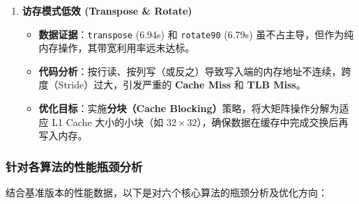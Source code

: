 \documentclass[a4paper]{article}
\begin{document}
\begin{enumerate}
    \item \textbf{访存模式低效 (Transpose \& Rotate)}
    \begin{itemize}
        \item \textbf{数据证据}：\texttt{transpose} (6.94s) 和 \texttt{rotate90} (6.79s) 虽不占主导，但作为纯内存操作，其带宽利用率远未达标。
        \item \textbf{代码分析}：按行读、按列写（或反之）导致写入端的内存地址不连续，跨度（Stride）过大，引发严重的 \textbf{Cache Miss} 和 \textbf{TLB Miss}。
        \item \textbf{优化目标}：实施\textbf{分块（Cache Blocking）}策略，将大矩阵操作分解为适应 L1 Cache 大小的小块（如 $32 \times 32$），确保数据在缓存中完成交换后再写入内存。
    \end{itemize}
\end{enumerate}
 
\subsubsection{针对各算法的性能瓶颈分析}

结合基准版本的性能数据，以下是对六个核心算法的瓶颈分析及优化方向：
\end{document}
